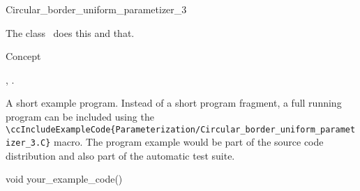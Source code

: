 

\begin{ccRefClass}{Circular_border_uniform_parametizer_3}  %


\ccDefinition
  
The class \ccRefName\ does this and that.


\ccIsModel

Concept

\ccTypes


\ccCreation
{}  %


\ccOperations


\ccSeeAlso

,
.

\ccExample

A short example program.
Instead of a short program fragment, a full running program can be
included using the 
\verb|\ccIncludeExampleCode{Parameterization/Circular_border_uniform_parametizer_3.C}| 
macro. The program example would be part of the source code distribution and
also part of the automatic test suite.

\begin{ccExampleCode}
void your_example_code() {
}
\end{ccExampleCode}


\end{ccRefClass}


